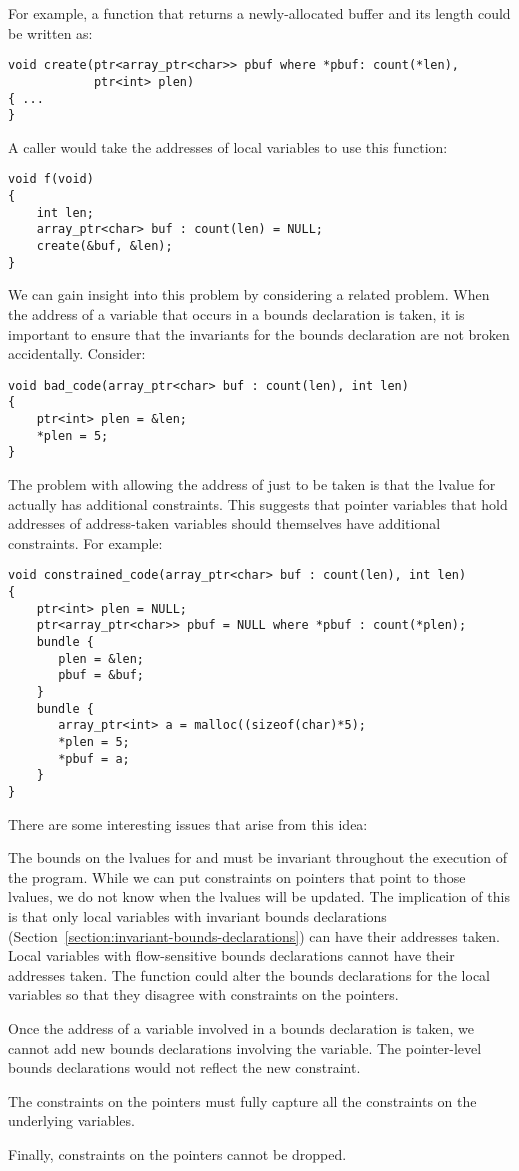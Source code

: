 For example, a function that returns a newly-allocated buffer and its length could be written as:
\begin{lstlisting}
void create(ptr<array_ptr<char>> pbuf where *pbuf: count(*len),
            ptr<int> plen)
{ ...
}
\end{lstlisting}
A caller would take the addresses of local variables to use this function:
\begin{lstlisting}
void f(void)
{
    int len;
    array_ptr<char> buf : count(len) = NULL;
    create(&buf, &len);
}
\end{lstlisting}

We can gain insight into this problem by considering a related
problem.   When the address of a variable that occurs in a bounds declaration is 
taken, it is important to ensure that the invariants for the bounds declaration are not
broken accidentally.  Consider:
\begin{lstlisting}
void bad_code(array_ptr<char> buf : count(len), int len) 
{
    ptr<int> plen = &len;
    *plen = 5;
}
\end{lstlisting}
The problem with allowing the address of just  to be taken is
that the lvalue for  actually has additional constraints. This
suggests that pointer variables that hold addresses of address-taken variables should
themselves have additional constraints.  For example:
\begin{lstlisting}
void constrained_code(array_ptr<char> buf : count(len), int len) 
{
    ptr<int> plen = NULL;
    ptr<array_ptr<char>> pbuf = NULL where *pbuf : count(*plen);
    bundle {
       plen = &len;
       pbuf = &buf;
    }
    bundle {
       array_ptr<int> a = malloc((sizeof(char)*5);
       *plen = 5;
       *pbuf = a;
    }
}
\end{lstlisting}
There are some interesting issues that arise from this idea:
\begin{compactitem}
\item The bounds on the lvalues for  and
 must be invariant throughout the execution of the program.
While we can put constraints on pointers that point to those lvalues,
we do not know when the lvalues will be updated.
The implication of this is that only local variables with invariant
bounds declarations (Section~\ref{section:invariant-bounds-declarations})
can have their addresses taken.   Local variables
with flow-sensitive bounds declarations cannot have their addresses taken.
The function could alter the bounds declarations for the local variables
so that they disagree with constraints on the pointers.
\item Once the address of a variable involved in a bounds declaration 
is taken, we cannot add new bounds declarations involving the variable.
The pointer-level bounds declarations would not reflect the new constraint.
\item The constraints on the pointers must fully capture 
all the constraints on the underlying variables.
\item Finally, constraints on the pointers cannot be dropped.
\end{compactitem}

